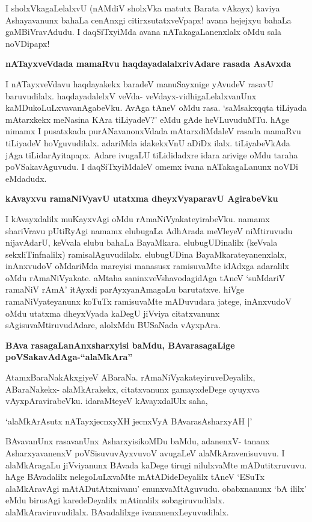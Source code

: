 I sholxVkagaLelalxvU (nAMdiV sholxVka matutx Barata vAkayx) kaviya Ashayavanunx bahaLa cenAnxgi citirxsu\-tatxveVpapx! avana hejejxyu bahaLa gaMBiVravAdudu. I daqSiTxyiMda avana nATakagaLanenxlalx oMdu sala noVDipapx!

{\bigskip
\noindent
{\large\bf nATayxveVdada mamaRvu haqdayadalalxrivAdare rasada AsAvxda}}\label{page244}
\medskip

\noindent
I nATayxveVdavu haqdayakekx baradeV manuSayxnige yAvudeV rasavU baruvudilalx. haqdayadalelxV veVda-\- veVdayx-vidhigaLelalxvanUnx kaMDukoLuLxvavanAgabeVku. AvAga tAneV oMdu rasa. `saMsakxqqta tiLiyada mAtarxkekx meNasina KAra tiLiyadeV?' eMdu gAde heVLuvuduMTu. hAge nimamx I pusatxkada purANava\-nonxVdada mAtarxdiMdaleV rasada mamaRvu tiLiyadeV hoVguvudilalx. adariMda idakekxVnU aDiDx ilalx. tiLiyabeVkAda jAga tiLidarAyitapapx. Adare ivugaLU tiLididadxre idara arivige oMdu taraha poVSaka\-vAguvudu. I daqSiTxyiMdaleV omemx ivana nATakagaLanunx noVDi eMdadudx.


{\bigskip
\noindent
{\large\bf kAvayxvu ramaNiVyavU utatxma dheyxVyaparavU AgirabeVku}}\label{page244}
\medskip

\noindent
I kAvayxdalilx muKayxvAgi oMdu rAmaNiVyakateyirabeVku. namamx shariVravu pUtiR\-yAgi namamx\- elubugaLa AdhArada meVleyeV niMtiruvudu nijavAdarU, keVvala elubu bahaLa BayaMkara. elubu\-gUDinalilx (keVvala sekxliTinfnalilx) ramisalAgu\-vudilalx. elubugUDina BayaMkarateyanenxlalx, inAnx\-vudoV oMdariMda mare\-yisi manasusx ramisuvaMte idAdxga adaralilx oMdu rAmaNiVyakate. aMtaha saninx\-veVsha\-vodagidAga tAneV `suMdariV ramaNiV rAmA' itAyxdi parAyxyanAmagaLu barutatxve. hiVge ramaNiV\-yate\-yanunx koTuTx ramisuvaMte mADuvudara jatege, inAnxvudoV oMdu utatxma dheyxVyada kaDegU jiVviya citatxvanunx sAgisuvaMtiruvudAdare, alolxMdu BUSaNada vAyxpAra.

{\bigskip
\noindent
{\large\bf BAva rasagaLanAnxsharxyisi baMdu, BAvarasagaLige poVSakavAdAga-\break ``alaMkAra''}}\label{page245}
\medskip

\noindent
AtamxBaraNakAkxgiyeV ABaraNa. rAmaNiVyakateyiruveDeyalilx, ABaraNakekx- alaMkArakekx, citatx\-vanunx gamayxdeDege oyuyxva vAyxpAravirabeVku. idaraMteyeV kAvayxdalUlx saha, 

\begin{shloka}
`alaMkArAsutx nATayxjecnxyXH jecnxVyA BAvarasAsharxyAH |'\label{245}
\end{shloka}

BAvavanUnx rasavanUnx AsharxyisikoMDu baMdu, adanenxV- tananx AsharxyavanenxV poVSisuvuvAyx\-vuvoV avugaLeV alaMkAravenisuvuvu. I alaMkAragaLu jiVviyanunx BAvada kaDege tirugi nilulxvaMte mADu\-titxruvuvu. hAge BAvadalilx nelegoLuLxvaMte mAtADideDeyalilx tAneV `ESuTx alaMkAravAgi mAtADu\-tAtxnivanu' enunxvaMtAguvudu. obabxnanunx `bA ililx' eMdu birusAgi karedeDeyalilx mAtinalilx soba\-giru\-vudilalx. alaMkAraviruvudilalx. BAvadalilxge ivananenxLeyuvudilalx.

